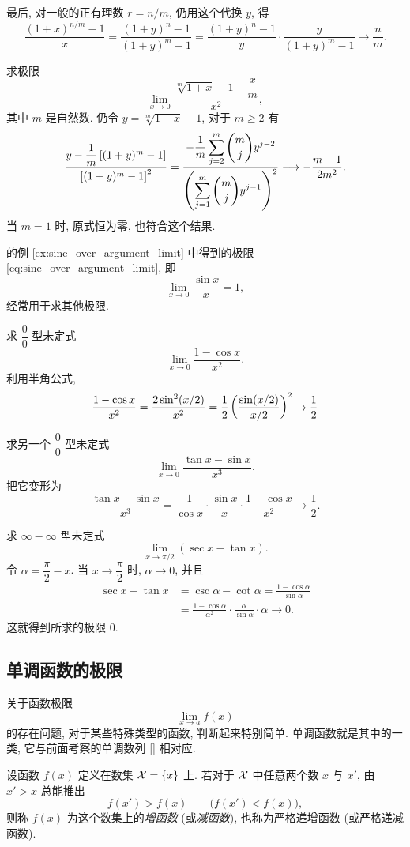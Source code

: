 最后, 对一般的正有理数 $r=n/m$, 仍用这个代换 $y$, 得
$$
\frac{(1+x)^{n/m}-1}{x}
=\frac{(1+y)^n-1}{(1+y)^m-1}
=\frac{(1+y)^n-1}{y}\cdot\frac{y}{(1+y)^m-1} \to \frac{n}{m}.
$$

\label{ex:root_second_order_increment_limit}
求极限
$$
\lim_{x\to0}\frac{\sqrt[m]{1+x}-1-\dfrac xm}{x^2},
$$
其中 $m$ 是自然数. 
仍令 $y=\sqrt[m]{1+x}-1$, 对于 $m\geq2$ 有
$$
\frac{y-\dfrac1m\left[ (1+y)^m-1 \right]}{\left[ (1+y)^m-1 \right]^2}
=\frac{-\dfrac1m\displaystyle\sum_{j=2}^{m}\binom mj y^{j-2}}
{\left(\displaystyle\sum_{j=1}^{m}\binom mj y^{j-1}\right)^2}\\
\longrightarrow-\frac{m-1}{2m^2}.
$$
当 $m=1$ 时, 原式恒为零, 也符合这个结果.

\label{ex:trigonometric_limit_applications}
 的例 \ref{ex:sine_over_argument_limit} 中得到的极限
\eqref{eq:sine_over_argument_limit}, 即
$$
\lim_{x\to0}\frac{\sin x}{x}=1,
$$
经常用于求其他极限.

\label{ex:one_minus_cosine_limit}
求 $\dfrac00$ 型未定式
$$
\lim_{x\to0}\frac{1-\cos x}{x^2}.
$$
利用半角公式,
$$
\frac{1-\cos x}{x^2}
=\frac{2\sin^2(x/2)}{x^2}
=\frac12\left( \frac{\sin(x/2)}{x/2} \right)^2 \to \frac{1}{2}
$$

\label{ex:tangent_minus_sine_limit}
求另一个 $\dfrac00$ 型未定式
$$
\lim_{x\to0}\frac{\tan x-\sin x}{x^3}.
$$
把它变形为
$$
\frac{\tan x-\sin x}{x^3}
=\frac1{\cos x}\cdot\frac{\sin x}{x}\cdot\frac{1-\cos x}{x^2}\to \frac{1}{2}.
$$

\label{ex:secant_minus_tangent_limit}
求 $\infty-\infty$ 型未定式
$$
\lim_{x\to\pi/2}(\sec x-\tan x).
$$
令 $\alpha=\dfrac\pi2-x$. 当 $x\to\dfrac\pi2$ 时, $\alpha\to0$, 并且
$$
\begin{aligned}
\sec x-\tan x
&=\csc\alpha-\cot\alpha
=\frac{1-\cos\alpha}{\sin\alpha}\\
&=\frac{1-\cos\alpha}{\alpha^2}\cdot
\frac{\alpha}{\sin\alpha}\cdot\alpha\longrightarrow0.
\end{aligned}
$$
这就得到所求的极限 $0$.

\subsection{单调函数的极限}\label{subsec:57}
关于函数极限
$$
\lim_{x\to a}f(x)
$$
的存在问题, 对于某些特殊类型的函数, 判断起来特别简单.
单调函数就是其中的一类, 它与前面考察的单调数列 [] 相对应.

设函数 $f(x)$ 定义在数集 $\mathcal{X}=\{x\}$ 上.
{\kaishu 若对于 $\mathcal{X}$ 中任意两个数 $x$ 与 $x'$, 由 $x'>x$ 总能推出
$$
f(x')>f(x)\qquad\bigl(f(x')<f(x)\bigr),
$$
则称 $f(x)$ 为这个数集上的\emph{增函数}
(或\emph{减函数}),
也称为严格递增函数 (或严格递减函数).}

